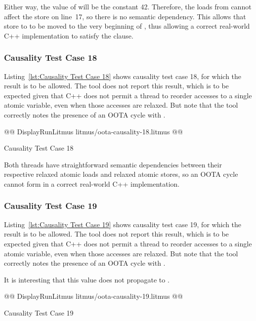 \documentclass[10]{article}
\begin{document}
Either way, the value of  will be the constant 42.
Therefore, the loads from  cannot affect the store on line~17,
so there is no semantic dependency.
This allows that store to  to be moved to the very beginning of
, thus allowing a correct real-world C++ implementation to
satisfy the  clause.

\subsubsection{Causality Test Case 18}
\label{app:Causality Test Case 18}

Listing~\ref{lst:Causality Test Case 18}
shows causality test case 18, for which the 
result is to be allowed.
The  tool does not report this result, which is to be expected
given that C++ does not permit a thread to reorder accesses to a single
atomic variable, even when those accesses are relaxed.
But note that the  tool correctly notes the presence of an
OOTA cycle with .

\begin{listing}[tbp]
@@ DisplayRunLitmus litmus/oota-causality-18.litmus @@
\caption{Causality Test Case 18}
\label{lst:Causality Test Case 18}
\end{listing}

Both threads have straightforward semantic dependencies between their
respective relaxed atomic loads and relaxed atomic stores, so an OOTA
cycle cannot form in a correct real-world C++ implementation.

\subsubsection{Causality Test Case 19}
\label{app:Causality Test Case 19}

Listing~\ref{lst:Causality Test Case 19}
shows causality test case 19, for which the 
result is to be allowed.
The  tool does not report this result, which is to be expected
given that C++ does not permit a thread to reorder accesses to a single
atomic variable, even when those accesses are relaxed.
But note that the  tool correctly notes the presence of an
OOTA cycle with .

It is interesting that this  value does not propagate to
.

\begin{listing}[tbp]
@@ DisplayRunLitmus litmus/oota-causality-19.litmus @@
\caption{Causality Test Case 19}
\label{lst:Causality Test Case 19}
\end{listing}
\end{document}

